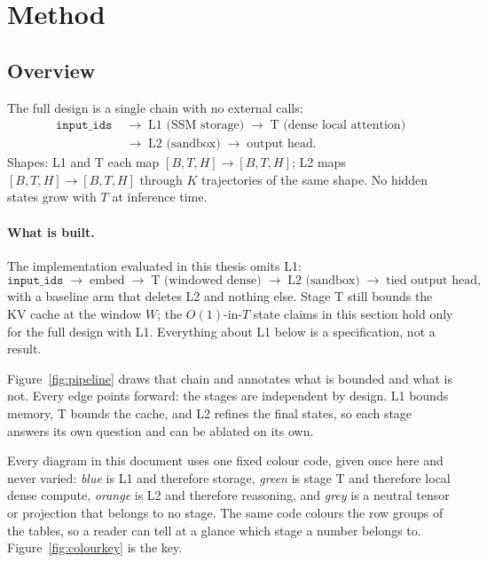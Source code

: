 \documentclass[11pt,a4paper]{article}
\theoremstyle{plain}
\theoremstyle{definition}
\theoremstyle{remark}
\begin{document}
\section{Method}
\label{sec:method}

\subsection{Overview}

\noindent
The full design is a single chain with no external calls:
\begin{equation}
  \begin{split}
  \texttt{input\_ids} &\;\to\; \text{L1 (SSM storage)}
    \;\to\; \text{T (dense local attention)}\\
  &\;\to\; \text{L2 (sandbox)} \;\to\; \text{output head}.
  \end{split}
  \label{eq:pipeline}
\end{equation}
Shapes: L1 and T each map $[B,T,H] \to [B,T,H]$; L2 maps $[B,T,H] \to [B,T,H]$
through $K$ trajectories of the same shape. No hidden states grow with $T$ at
inference time.

\paragraph{What is built.}
The implementation evaluated in this thesis omits L1:
\begin{equation}
  \texttt{input\_ids} \;\to\; \text{embed} \;\to\; \text{T (windowed dense)}
  \;\to\; \text{L2 (sandbox)} \;\to\; \text{tied output head},
  \label{eq:built}
\end{equation}
with a baseline arm that deletes L2 and nothing else. Stage T still bounds the
KV cache at the window $W$; the $O(1)$-in-$T$ state claims in this section
hold only for the full design with L1. Everything about L1 below is a
specification, not a result.

Figure~\ref{fig:pipeline} draws that chain and annotates what is bounded and
what is not. Every edge points forward: the stages are independent by design.
L1 bounds memory, T bounds the cache, and L2 refines the final states, so each
stage answers its own question and can be ablated on its own.

Every diagram in this document uses one fixed colour code, given once here and
never varied: \emph{blue} is L1 and therefore storage, \emph{green} is stage T
and therefore local dense compute, \emph{orange} is L2 and therefore
reasoning, and \emph{grey} is a
neutral tensor or projection that belongs to no stage. The same code colours the
row groups of the tables, so a reader can tell at a glance which stage a number
belongs to. Figure~\ref{fig:colourkey} is the key.
\end{document}
